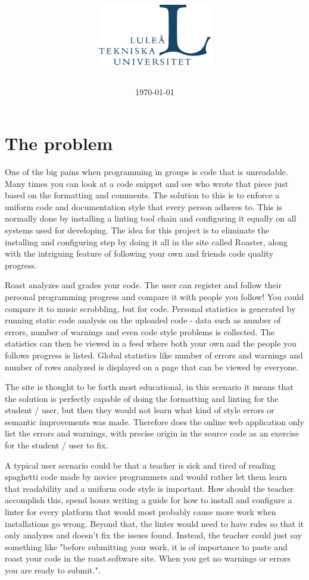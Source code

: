 \documentclass[12pt,a4paper]{report}
\title{
    \coursecode{} \\
    \coursename{} \\
    \vspace{1.8em}
    \begin{figure}[H]
      \centering
      
    \end{figure}
    \textbf{\projectname{}} \break
    \author{
        \authorsinfo{}
    } \break{}
    \schoolinfo{}
    \vspace{1.4em}
    \begin{figure}[H]
      \centering
      \includegraphics[width=5cm]{LTU.jpg}
    \end{figure}
}
\date{\today}
\begin{document}
\maketitle
\thispagestyle{empty} %
\newpage

{\hypersetup{linkcolor=black}
    \tableofcontents}
\newpage

\listoftodos
{}
\newpage

\chapter{The problem}
One of the big pains when programming in groups is code that is unreadable. Many times you can look at a code snippet and see who wrote that piece
just based on the formatting and comments. The solution to this is to enforce a uniform code and documentation style that every person adheres to.
This is normally done by installing a linting tool chain and configuring it equally on all systems used for developing. 
The idea for this project is to eliminate the installing and configuring step by doing it all in the site called Roaster, along with the intriguing feature of following your own and friends code quality progress.

Roast analyzes and grades your code. The user can register and follow their personal programming progress and compare it with people you follow! 
You could compare it to music scrobbling, but for code.
Personal statistics is generated by running static code analysis on the uploaded code - data such as number of errors, number of warnings and even code style problems is collected.
The statistics can then be viewed in a feed where both your own and the people you follows progress is listed.
Global statistics like number of errors and warnings and number of rows analyzed is displayed on a page that can be viewed by everyone.

The site is thought to be forth most educational, in this scenario it means that the solution is perfectly capable of doing the formatting and linting for the student / user, but then they would not learn what kind of style errors 
or semantic improvements was made. Therefore does the online web application only list the errors and warnings, with precise origin in the source code as an exercise for the student / user to fix.

A typical user scenario could be that a teacher is sick and tired of reading spaghetti code made by novice programmers and would rather let them learn that readability and a uniform code style is important.
How should the teacher accomplish this, spend hours writing a guide for how to install and configure a linter for every platform that would most probably cause more work when installations go wrong. 
Beyond that, the linter would need to have rules so that it only analyzes and doesn't fix the issues found. 
Instead, the teacher could just say something like "before submitting your work, it is of importance to paste and roast your code in the roast.software site. When you get no warnings or errors you are ready to submit.".
\end{document}
